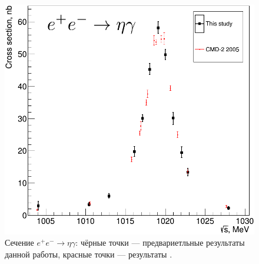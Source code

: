 \begin{figure}[htbp]
\begin{minipage}[t]{.48\textwidth}
		\includegraphics[width=\textwidth]{img/cs_etag_at_phi.png}
		\caption{Сечение $e^+ e^- \to \eta \gamma$:
			чёрные точки --- предвариетльные результаты данной работы,
			красные точки --- результаты \cite{Akhmetshin:2004gw}.}\label{fig:cs_etag_mine}
	\end{minipage}
\end{figure}




